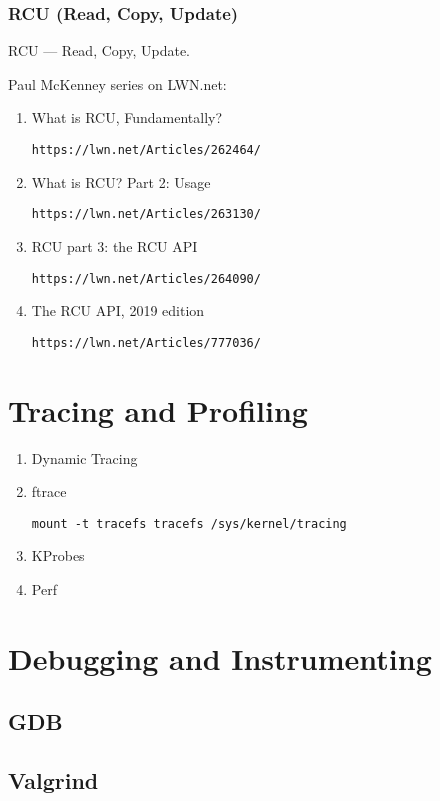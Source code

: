 \documentclass[12pt,a4paper]{article}
\begin{document}
\subsubsection{RCU (Read, Copy, Update)}

RCU --- Read, Copy, Update.

Paul McKenney series on LWN.net:

\begin{enumerate}

\item What is RCU, Fundamentally?

	\texttt{https://lwn.net/Articles/262464/}

\item What is RCU? Part 2: Usage

	\texttt{https://lwn.net/Articles/263130/}

\item RCU part 3: the RCU API

	\texttt{https://lwn.net/Articles/264090/}

\item The RCU API, 2019 edition

	\texttt{https://lwn.net/Articles/777036/}

\end{enumerate}

\section{Tracing and Profiling}

\begin{enumerate}
\item Dynamic Tracing
\item ftrace
\begin{verbatim}
mount -t tracefs tracefs /sys/kernel/tracing
\end{verbatim}
\item KProbes
\item Perf
\end{enumerate}

\section{Debugging and Instrumenting}

\subsection{GDB}

\subsection{Valgrind}
\end{document}
